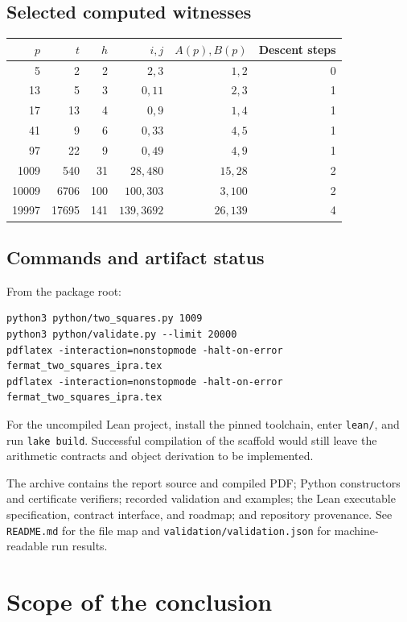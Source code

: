 \documentclass[11pt,letterpaper]{article}
\theoremstyle{definition}
\theoremstyle{remark}
\begin{document}
\subsection{Selected computed witnesses}

\begin{center}
\begin{tabular}{@{}rrrrrr@{}}
\toprule
\(p\) & \(t\) & \(h\) & \(i,j\) & \(A(p),B(p)\) & Descent steps\\
\midrule
5 & 2 & 2 & \(2,3\) & \(1,2\) & 0\\
13 & 5 & 3 & \(0,11\) & \(2,3\) & 1\\
17 & 13 & 4 & \(0,9\) & \(1,4\) & 1\\
41 & 9 & 6 & \(0,33\) & \(4,5\) & 1\\
97 & 22 & 9 & \(0,49\) & \(4,9\) & 1\\
1009 & 540 & 31 & \(28,480\) & \(15,28\) & 2\\
10009 & 6706 & 100 & \(100,303\) & \(3,100\) & 2\\
19997 & 17695 & 141 & \(139,3692\) & \(26,139\) & 4\\
\bottomrule
\end{tabular}
\end{center}

\subsection{Commands and artifact status}

From the package root:
\begin{lstlisting}
python3 python/two_squares.py 1009
python3 python/validate.py --limit 20000
pdflatex -interaction=nonstopmode -halt-on-error fermat_two_squares_ipra.tex
pdflatex -interaction=nonstopmode -halt-on-error fermat_two_squares_ipra.tex
\end{lstlisting}
For the uncompiled Lean project, install the pinned toolchain, enter
\texttt{lean/}, and run \texttt{lake build}. Successful compilation of
the scaffold would still leave the arithmetic contracts and object
derivation to be implemented.

The archive contains the report source and compiled PDF; Python
constructors and certificate verifiers; recorded validation and examples;
the Lean executable specification, contract interface, and roadmap; and
repository provenance. See \texttt{README.md} for the file map and
\texttt{validation/validation.json} for machine-readable run results.

\section{Scope of the conclusion}
\end{document}
